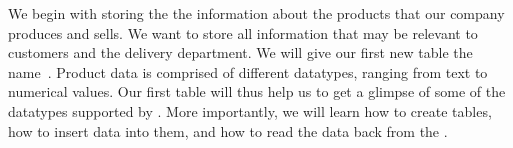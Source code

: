 %
\label{sec:factory:table:product}%
%
We begin with storing the the information about the products that our company produces and sells.
We want to store all information that may be relevant to customers and the delivery department.
We will give our first new table the name~.%
%
%
%
Product data is comprised of different datatypes, ranging from text to numerical values.
Our first table will thus help us to get a glimpse of some of the datatypes supported by \sql.
More importantly, we will learn how to create tables, how to insert data into them, and how to read the data back from the .%
%
%
%
%
%
\FloatBarrier%
\endhsection%
%
